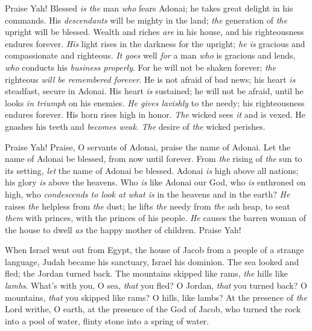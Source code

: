 \begin{biblechapter} %
 Praise Yah! 
Blessed \textit{is the} man \textit{who} fears Adonai; 
he takes great delight in his commands.
\verse His \textit{descendants} will be mighty in the land; 
\textit{the} generation of \textit{the} upright will be blessed.
\verse Wealth and riches \textit{are} in his house, 
and his righteousness endures forever.
\verse \textit{His} light rises in the darkness for the upright; 
\textit{he is} gracious and compassionate and righteous.
\verse \textit{It goes} well \textit{for} a man \textit{who} is gracious and lends, 
\textit{who} conducts his \textit{business properly}.
\verse For he will not be shaken forever; 
\textit{the} righteous \textit{will be remembered forever}.
\verse He is not afraid of bad news; 
his heart \textit{is} steadfast, secure in Adonai.
\verse His heart \textit{is} sustained; he will not be afraid, 
until he looks \textit{in triumph} on his enemies.
\verse \textit{He gives lavishly} to the needy; 
his righteousness endures forever. 
His horn rises high in honor.
\verse \textit{The} wicked sees \textit{it} and is vexed. 
He gnashes his teeth and \textit{becomes weak}. 
\textit{The} desire of \textit{the} wicked perishes.
\end{biblechapter}

\begin{biblechapter} %
 Praise Yah! 
Praise, O servants of Adonai, 
praise the name of Adonai.
\verse Let the name of Adonai be blessed, 
from now until forever.
\verse From \textit{the} rising of \textit{the} sun to its setting, 
\textit{let} the name of Adonai be blessed.
\verse Adonai \textit{is} high above all nations; 
his glory \textit{is} above the heavens.
\verse Who \textit{is} like Adonai our God, 
who \textit{is} enthroned on high,
\verse who \textit{condescends to look at} 
\textit{what is} in the heavens and in the earth?
\verse \textit{He} raises \textit{the} helpless from \textit{the} dust; 
he lifts \textit{the} needy from \textit{the} ash heap,
\verse to seat \textit{them} with princes, 
with the princes of his people.
\verse \textit{He} causes the barren woman of the house to dwell 
\textit{as} the happy mother of children. 
Praise Yah!
\end{biblechapter}

\begin{biblechapter} %
 When Israel went out from Egypt, 
the house of Jacob from a people of a strange language,
\verse Judah became his sanctuary, 
Israel his dominion.
\verse The sea looked and fled; 
the Jordan turned back.
\verse The mountains skipped like rams, 
\textit{the} hills like \textit{lambs}.
\verse What’s with you, O sea, \textit{that} you fled? 
O Jordan, \textit{that} you turned back?
\verse O mountains, \textit{that} you skipped like rams? 
O hills, like lambs?
\verse At the presence of \textit{the} Lord writhe, O earth, 
at the presence of the God of Jacob,
\verse who turned the rock into a pool of water, 
flinty stone into a spring of water.
\end{biblechapter}

